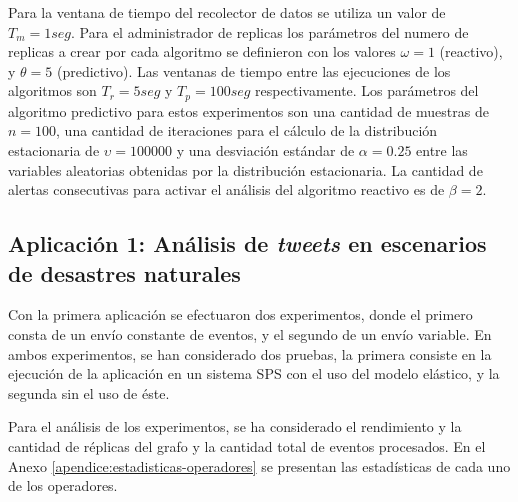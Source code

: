 Para la ventana de tiempo del recolector de datos se utiliza un valor de $T_m = 1seg$. Para el administrador de replicas los parámetros del numero de replicas a crear por cada algoritmo se definieron con los valores $\omega = 1$ (reactivo), y $\theta = 5$ (predictivo). Las ventanas de tiempo entre las ejecuciones de los algoritmos son $T_r = 5seg$ y $T_p = 100seg$ respectivamente. Los parámetros del algoritmo predictivo para estos experimentos son una cantidad de muestras de $n = 100$, una cantidad de iteraciones para el cálculo de la distribución estacionaria de $\upsilon = 100000$ y una desviación estándar de $\alpha = 0.25$ entre las variables aleatorias obtenidas por la distribución estacionaria. La cantidad de alertas consecutivas para activar el análisis del algoritmo reactivo es de $\beta = 2$.

\subsection{Aplicación 1: Análisis de \textit{tweets} en escenarios de desastres naturales}
Con la primera aplicación se efectuaron dos experimentos, donde el primero consta de un envío constante de eventos, y el segundo de un envío variable. En ambos experimentos, se han considerado dos pruebas, la primera consiste en la ejecución de la aplicación en un sistema SPS con el uso del modelo elástico, y la segunda sin el uso de éste.


Para el análisis de los experimentos, se ha considerado \normalsize{el rendimiento y la cantidad de réplicas del grafo} y la cantidad total de eventos procesados. \normalsize{En el Anexo} \ref{apendice:estadisticas-operadores} \normalsize{se presentan las estadísticas de cada uno de los operadores.}



